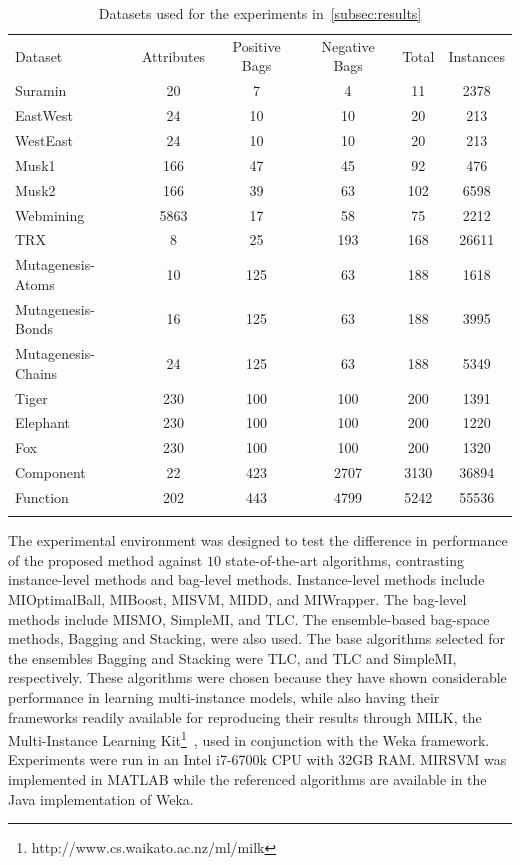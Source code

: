 \documentclass[preprint,12pt]{elsarticle}
\begin{document}
\begin{table}[t!]
\caption{Datasets used for the experiments in~\ref{subsec:results}}
\small
\label{tab:Dataset}
\begin{tabularx}{\textwidth}{l@{\extracolsep{\fill}}ccccc}
\hline\noalign{\smallskip}
Dataset & Attributes & Positive Bags & Negative Bags & Total & Instances \\
\noalign{\smallskip}\hline\noalign{\smallskip}
Suramin 			& 20 	& 7 	& 4 	& 11 	& 2378 	\\
EastWest 			& 24 	& 10 	& 10 	& 20 	& 213 	\\
WestEast 			& 24 	& 10 	& 10 	& 20 	& 213 	\\
Musk1 				& 166 	& 47 	& 45 	& 92 	& 476 	\\
Musk2 				& 166 	& 39 	& 63 	& 102 	& 6598 	\\
Webmining			& 5863	& 17	& 58	& 75	& 2212	\\
TRX 				& 8 	& 25 	& 193 	& 168 	& 26611 \\
Mutagenesis-Atoms 	& 10 	& 125 	& 63 	& 188 	& 1618 	\\
Mutagenesis-Bonds 	& 16 	& 125 	& 63 	& 188 	& 3995 	\\
Mutagenesis-Chains 	& 24 	& 125 	& 63 	& 188 	& 5349 	\\
Tiger 				& 230 	& 100 	& 100 	& 200 	& 1391 	\\
Elephant 			& 230 	& 100 	& 100 	& 200 	& 1220 	\\
Fox 				& 230 	& 100 	& 100 	& 200 	& 1320 	\\
Component			& 22	& 423	& 2707	& 3130	& 36894	\\
Function			& 202	& 443	& 4799	& 5242	& 55536	\\
\noalign{\smallskip}\hline
\end{tabularx}
\end{table}

The experimental environment was designed to test the difference in performance of the proposed method against $10$ state-of-the-art algorithms, contrasting instance-level methods and bag-level methods. Instance-level methods include MIOptimalBall, MIBoost, MISVM, MIDD, and MIWrapper. The bag-level methods include MISMO, SimpleMI, and TLC. The ensemble-based bag-space methods, Bagging and Stacking, were also used. The base algorithms selected for the ensembles Bagging and Stacking were TLC, and TLC and SimpleMI, respectively. These algorithms were chosen because they have shown considerable performance in learning multi-instance models, while also having their frameworks readily available for reproducing their results through MILK, the Multi-Instance Learning Kit\footnote{http://www.cs.waikato.ac.nz/ml/milk}~\citep{Xu2003}, used in conjunction with the Weka framework. Experiments were run in an Intel i7-6700k CPU with 32GB RAM. MIRSVM was implemented in MATLAB while the referenced algorithms are available in the Java implementation of Weka.
\end{document}

